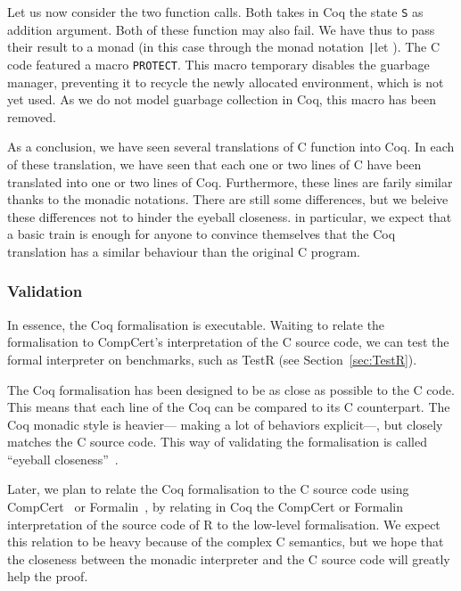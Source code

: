 \documentclass{article}
\newcommand\Coq{Coq}
\newcommand\R{R}
\newcommand\Cn{C}
\begin{document}
Let us now consider the two function calls.
Both takes in \Coq{} the state \texttt{S} as addition argument.
Both of these function may also fail.
We have thus to pass their result to a monad
(in this case through the monad notation \texttt|let%
).
The \Cn{} code featured a macro \texttt{PROTECT}.
This macro temporary disables the guarbage manager,
preventing it to recycle the newly allocated environment,
which is not yet used.
As we do not model guarbage collection in \Coq{},
this macro has been removed.

As a conclusion,
we have seen several translations of \Cn{} function into \Coq{}.
In each of these translation,
we have seen that each one or two lines of \Cn{}
have been translated into one or two lines of \Coq{}.
Furthermore, these lines are farily similar
thanks to the monadic notations.
There are still some differences, but we beleive these differences
not to hinder the eyeball closeness.
in particular, we expect that a basic train is enough for anyone
to convince themselves that the \Coq{} translation has a similar behaviour
than the original \Cn{} program.


\subsubsection{Validation}
\label{sec:validation}

In essence, the \Coq{} formalisation is executable.
Waiting to relate the formalisation to CompCert's interpretation
of the \Cn{} source code, we can test the formal interpreter
on benchmarks,
such as TestR (see Section~\ref{sec:TestR}).

The \Coq{} formalisation has been designed to be as close as
possible to the \Cn{} code.
This means that each line of the \Coq{} can be compared to its
\Cn{} counterpart.
The \Coq{} monadic style is heavier—%
making a lot of behaviors explicit—,
but closely matches the \Cn{} source code.
This way of validating the formalisation
is called “eyeball closeness”~\parencite{bodin2014trusted}.

Later, we plan to relate the \Coq{} formalisation
to the \Cn{} source code using CompCert~\parencite{Leroy-Compcert-CACM}
or Formalin~\parencite{formalin},
by relating in \Coq{} the CompCert or Formalin interpretation
of the source code of \R{}
to the low-level formalisation.
We expect this relation to be heavy because of the complex \Cn{} semantics,
but we hope that the closeness between the monadic interpreter and the \Cn{}
source code will greatly help the proof.
\end{document}
